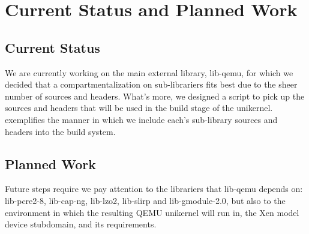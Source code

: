 \chapter{Current Status and Planned Work}
\label{chapter:status-planned-work}

\section{Current Status}
\label{sec:current-status}

We are currently working on the main external library, lib-qemu, for which we decided that a compartmentalization on sub-librariers fits best due to the sheer number of sources and headers.
What's more, we designed a script to pick up the sources and headers that will be used in the build stage of the unikernel.
 exemplifies the manner in which we include each's sub-library sources and headers into the build system.

\section{Planned Work}
\label{sec:planned work}

Future steps require we pay attention to the librariers that lib-qemu depends on: lib-pcre2-8, lib-cap-ng, lib-lzo2, lib-slirp and lib-gmodule-2.0, but also to the environment in which the resulting QEMU unikernel will run in, the Xen model device stubdomain, and its requirements.
